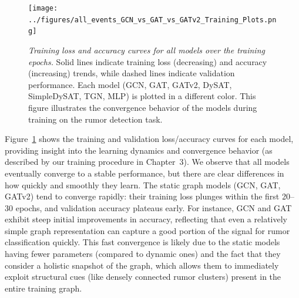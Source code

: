 \documentclass{cshonours}
\begin{document}
\begin{figure}
\centering
\texttt{[image: ../figures/all\_events\_GCN\_vs\_GAT\_vs\_GATv2\_Training\_Plots.png]}
\caption[Training loss and accuracy curves]{\textit{Training loss and accuracy curves for all models over the training epochs.} Solid lines indicate training loss (decreasing) and accuracy (increasing) trends, while dashed lines indicate validation performance. Each model (GCN, GAT, GATv2, DySAT, SimpleDySAT, TGN, MLP) is plotted in a different color. This figure illustrates the convergence behavior of the models during training on the rumor detection task.}
\label{fig:training_curves}
\end{figure}

Figure~\ref{fig:training_curves} shows the training and validation loss/accuracy curves for each model, providing insight into the learning dynamics and convergence behavior (as described by our training procedure in Chapter~3). We observe that all models eventually converge to a stable performance, but there are clear differences in how quickly and smoothly they learn. The static graph models (GCN, GAT, GATv2) tend to converge rapidly: their training loss plunges within the first 20--30 epochs, and validation accuracy plateaus early. For instance, GCN and GAT exhibit steep initial improvements in accuracy, reflecting that even a relatively simple graph representation can capture a good portion of the signal for rumor classification quickly. This fast convergence is likely due to the static models having fewer parameters (compared to dynamic ones) and the fact that they consider a holistic snapshot of the graph, which allows them to immediately exploit structural cues (like densely connected rumor clusters) present in the entire training graph.
\end{document}
